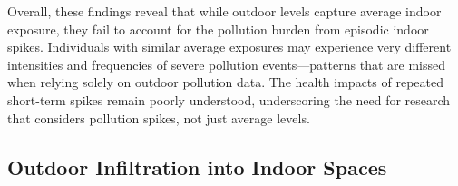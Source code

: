 \documentclass[9pt,twocolumn,twoside]{pnas-new}
\begin{document}
Overall, these findings reveal that while outdoor levels capture average indoor exposure, they fail to account for the pollution burden from episodic indoor spikes. Individuals with similar average exposures may experience very different intensities and frequencies of severe pollution events—patterns that are missed when relying solely on outdoor pollution data. The health impacts of repeated short-term spikes remain poorly understood, underscoring the need for research that considers pollution spikes, not just average levels.
\subsection{Outdoor Infiltration into Indoor Spaces}
\label{ssec:infiltration}
\end{document}
